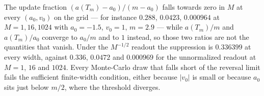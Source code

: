 The update fraction $(a(T_m) - a_0)/(m - a_0)$ falls towards zero in $M$ at
every $(a_0, v_0)$ on the grid --- for instance $0.288$, $0.0423$, $0.000964$
at $M = 1, 16, 1024$ with $a_0 = -1.5$, $v_0 = 1$, $m = 2.9$ --- while
$a(T_m)/m$ and $a(T_m)/a_0$ converge to $a_0/m$ and to $1$ instead, so those
two ratios are not the quantities that vanish. Under the $M^{-1/2}$ readout
the suppression is $0.336399$ at every width, against $0.336$, $0.0472$ and
$0.000969$ for the unnormalized readout at $M = 1$, $16$ and $1024$. Every
Monte-Carlo draw that falls short of the reversal limit fails the sufficient
finite-width condition, either because $|v_0|$ is small or because $a_0$ sits
just below $m/2$, where the threshold diverges.


